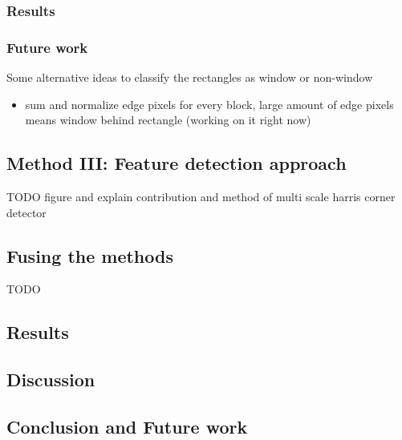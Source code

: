 	 


\subsubsection{Results}

\subsubsection{Future work}
Some alternative ideas to classify the rectangles as window or non-window
\begin{itemize}
	\item sum and normalize edge pixels for every block, large amount of edge pixels means window behind rectangle (working on it right now)
\end{itemize}


\subsection{Method III: Feature detection approach}
	TODO figure and explain contribution and method of multi scale harris corner detector

\subsection{Fusing the methods}
	TODO

\subsection{Results}
\subsection{Discussion}  %
\subsection{Conclusion and Future work}




% 
% 
% 
% 
% 
% 
% 
% 
